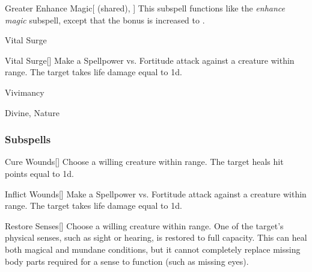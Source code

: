 \begin{ability}[\nth{8}]{Greater Enhance Magic}[ (shared), ]
This subspell functions like the \textit{enhance magic} subspell, except that the bonus is increased to .
\end{ability}
\vspace{0.25em}

\newpage
\begin{spellsection}{Vital Surge}


\begin{ability}{Vital Surge}[]
Make a Spellpower vs. Fortitude attack against a creature within \rngmed range.
\hit The target takes life damage equal to  \minus1d.
\end{ability}




 Vivimancy

 Divine, Nature
\end{spellsection}


\subsubsection{Subspells}


\begin{ability}[\nth{1}]{Cure Wounds}[]
Choose a willing creature within \rngmed range.
The target heals hit points equal to  \plus1d.
\end{ability}
\vspace{0.25em}


\begin{ability}[\nth{1}]{Inflict Wounds}[]
Make a Spellpower vs. Fortitude attack against a creature within \rngmed range.
\hit The target takes life damage equal to  \plus1d.
\end{ability}
\vspace{0.25em}


\begin{ability}[\nth{2}]{Restore Senses}[]
Choose a willing creature within \rngclose range.
One of the target's physical senses, such as sight or hearing, is restored to full capacity.
This can heal both magical and mundane conditions, but it cannot completely replace missing body parts required for a sense to function (such as missing eyes).
\end{ability}
\vspace{0.25em}


